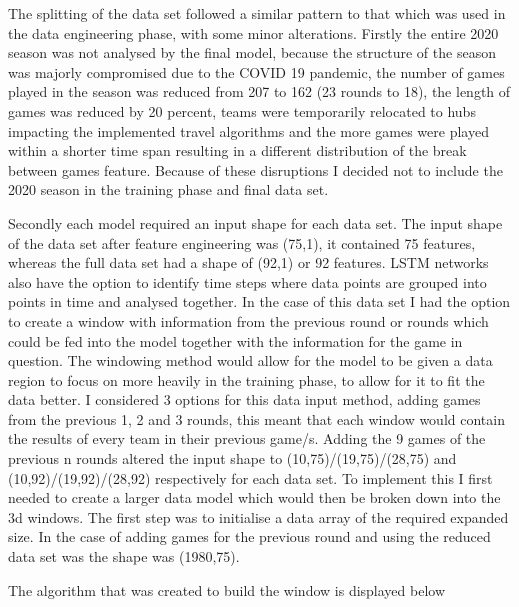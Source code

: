\documentclass{imc-inf}
\begin{document}
	The splitting of the data set followed a similar pattern to that which was used in the data engineering phase, with some minor alterations. Firstly the entire 2020 season was not analysed by the final model, because the structure of the season was majorly compromised due to the COVID 19 pandemic, the number of games played in the season was reduced from 207 to 162 (23 rounds to 18), the length of games was reduced by 20 percent, teams were temporarily relocated to hubs impacting the implemented travel algorithms and the more games were played within a shorter time span resulting in a different distribution of the break between games feature. Because of these disruptions I decided not to include the 2020 season in the training phase and final data set.  
	
	Secondly each model required an input shape for each data set. The input shape of the data set after feature engineering was (75,1), it contained 75 features, whereas the full data set had a shape of (92,1) or 92 features. LSTM networks also have the option to identify time steps where data points are grouped into points in time and analysed together. In the case of this data set I had the option to create a window with information from the previous round or rounds which could be fed into the model together with the information for the game in question. The windowing method would allow for the model to be given a data region to focus on more heavily in the training phase, to allow for it to fit the data better. I considered 3 options for this data input method, adding games from the previous 1, 2 and 3 rounds, this meant that each window would contain the results of every team in their previous game/s. Adding the 9 games of the previous n rounds altered the input shape to (10,75)/(19,75)/(28,75) and (10,92)/(19,92)/(28,92) respectively for each data set. To implement this I first needed to create a larger data model which would then be broken down into the 3d windows. The first step was to initialise a data array of the required expanded size. In the case of adding games for the previous round and using the reduced data set was the shape was (1980,75).

	The algorithm that was created to build the window is displayed below
\end{document}
